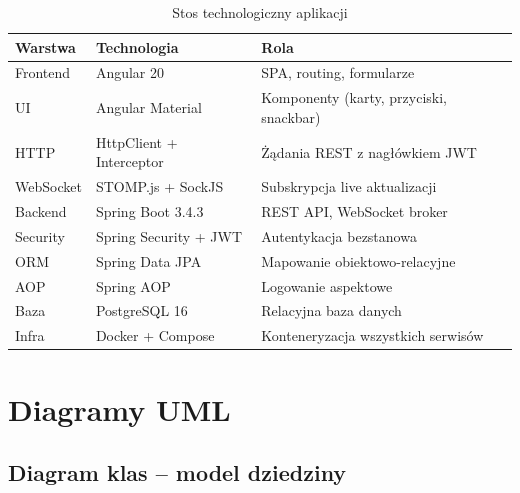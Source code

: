\documentclass[12pt, a4paper]{article}
\begin{document}
\begin{table}[H]
\centering
\begin{tabularx}{\textwidth}{llX}
\toprule
\textbf{Warstwa} & \textbf{Technologia} & \textbf{Rola} \\
\midrule
Frontend  & Angular 20            & SPA, routing, formularze \\
UI        & Angular Material      & Komponenty (karty, przyciski, snackbar) \\
HTTP      & HttpClient + Interceptor & Żądania REST z nagłówkiem JWT \\
WebSocket & STOMP.js + SockJS     & Subskrypcja live aktualizacji \\
Backend   & Spring Boot 3.4.3     & REST API, WebSocket broker \\
Security  & Spring Security + JWT & Autentykacja bezstanowa \\
ORM       & Spring Data JPA       & Mapowanie obiektowo-relacyjne \\
AOP       & Spring AOP            & Logowanie aspektowe \\
Baza      & PostgreSQL 16         & Relacyjna baza danych \\
Infra     & Docker + Compose      & Konteneryzacja wszystkich serwisów \\
\bottomrule
\end{tabularx}
\caption{Stos technologiczny aplikacji}
\end{table}

\section{Diagramy UML}

\subsection{Diagram klas -- model dziedziny}
\end{document}
